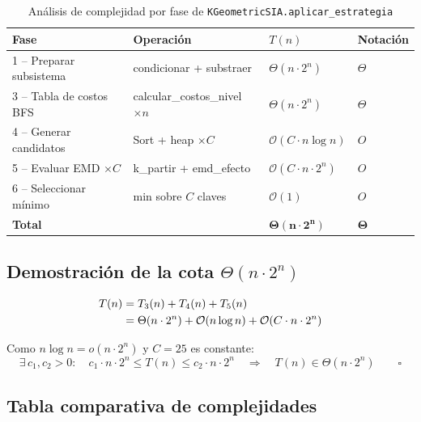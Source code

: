 \documentclass[12pt,letterpaper]{article}
\theoremstyle{definition}
\theoremstyle{remark}
\newcommand{\BigO}[1]{\mathcal{O}(#1)}
\newcommand{\BigTheta}[1]{\Theta(#1)}
\begin{document}
\begin{table}[ht]
\centering
\caption{Análisis de complejidad por fase de \texttt{KGeometricSIA.aplicar\_estrategia}}
\label{tab:complejidad-fases}
\begin{tabular}{@{}l l l l@{}}
\toprule
\textbf{Fase} & \textbf{Operación} & \textbf{$T(n)$} & \textbf{Notación} \\
\midrule
1 -- Preparar subsistema & condicionar + substraer & $\BigTheta{n \cdot 2^n}$ & $\Theta$ \\
3 -- Tabla de costos BFS & calcular\_costos\_nivel $\times n$ & $\BigTheta{n \cdot 2^n}$ & $\Theta$ \\
4 -- Generar candidatos  & Sort + heap $\times C$ & $\BigO{C \cdot n \log n}$ & $O$ \\
5 -- Evaluar EMD $\times C$ & k\_partir + emd\_efecto & $\BigO{C \cdot n \cdot 2^n}$ & $O$ \\
6 -- Seleccionar mínimo & min sobre $C$ claves & $\BigO{1}$ & $O$ \\
\midrule
\textbf{Total} & & $\bm{\BigTheta{n \cdot 2^n}}$ & $\bm{\Theta}$ \\
\bottomrule
\end{tabular}
\end{table}

\subsection{Demostración de la cota $\BigTheta{n \cdot 2^n}$}

\begin{align}
  T(n) &= T_3(n) + T_4(n) + T_5(n) \notag \\
       &= \BigTheta{n \cdot 2^n} + \BigO{n \log n} + \BigO{C \cdot n \cdot 2^n}
  \label{eq:complejidad-total}
\end{align}

Como $n \log n = o(n \cdot 2^n)$ y $C = 25$ es constante:
\begin{equation}
  \exists\, c_1, c_2 > 0: \quad
  c_1 \cdot n \cdot 2^n \leq T(n) \leq c_2 \cdot n \cdot 2^n
  \quad \Rightarrow \quad T(n) \in \BigTheta{n \cdot 2^n} \qquad \square
\end{equation}

\subsection{Tabla comparativa de complejidades}
\end{document}
